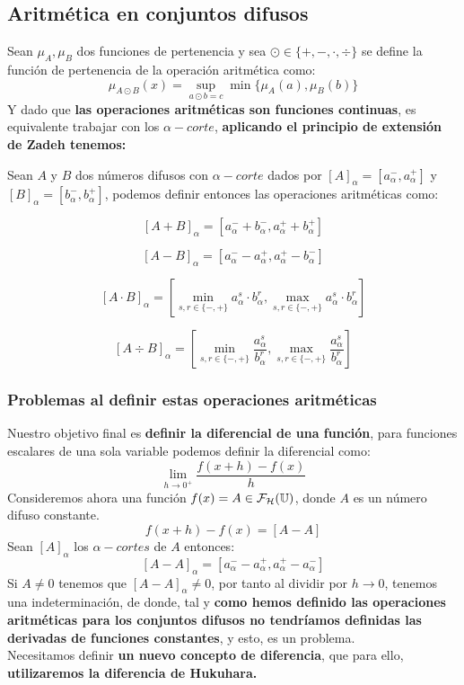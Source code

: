 \subsection{Aritmética en conjuntos difusos}
Sean $\mu_A, \mu_B$ dos funciones de pertenencia y sea $\odot \in \{+, -, \cdot, \div\}$ se define la función de pertenencia de la operación aritmética como:
$$
\mu_{A \odot B}(x) = \sup_{a \odot b = c} \min\{\mu_A(a), \mu_B(b)\}
$$
Y dado que \textbf{las operaciones aritméticas son funciones continuas}, es equivalente trabajar con los $\alpha-corte$, \textbf{aplicando el principio de extensión de Zadeh tenemos:}

Sean $A$ y $B$ dos números difusos con $\alpha-corte$ dados por $[A]_\alpha=[a_\alpha^-, a_\alpha^+]$ y $[B]_\alpha=[b_\alpha^-, b_\alpha^+]$, podemos definir entonces las operaciones aritméticas como:

$$
[A+B]_\alpha = [a_\alpha^- + b_\alpha^-, a_\alpha^+ + b_\alpha^+]
$$

$$
[A-B]_\alpha = [a_\alpha^- - a_\alpha^+, a_\alpha^+ - b_\alpha^-]
$$

$$
[A \cdot B]_\alpha = \left[ \min_{s, r \in \{-, +\}} a_\alpha^s \cdot b_\alpha^r, \max_{s, r \in \{-, +\}} a_\alpha^s \cdot b_\alpha^r\right]
$$

$$
[A \div B]_\alpha = \left[ \min_{s, r \in \{-, +\}} \frac{a_\alpha^s}{b_\alpha^r}, \max_{s, r \in \{-, +\}} \frac{a_\alpha^s}{b_\alpha^r}\right]
$$

\subsubsection{Problemas al definir estas operaciones aritméticas}
Nuestro objetivo final es \textbf{definir la diferencial de una función}, para funciones escalares de una sola variable podemos definir la diferencial como:
$$
\lim\limits_{h\rightarrow 0^+} \frac{f(x+h) - f(x)}{h}
$$
Consideremos ahora una función $f(x)=A\in \mathcal{F}_\mathcal{H}(\mathbb U)$, donde $A$ es un número difuso constante. \\
$$f(x+h) - f(x)=[A-A]$$
Sean $[A]_\alpha$ los $\alpha-cortes$ de $A$ entonces:
$$
[A-A]_\alpha = [a_\alpha^- - a_\alpha^+, a_\alpha^+ - a_\alpha^-]
$$
Si $A\neq 0$ tenemos que $[A-A]_\alpha \neq 0$, por tanto al dividir por $h \longrightarrow 0$, tenemos una indeterminación, de donde, tal y \textbf{como hemos definido las operaciones aritméticas para los conjuntos difusos no tendríamos definidas las derivadas de funciones constantes}, y esto, es un problema. \\
Necesitamos definir \textbf{un nuevo concepto de diferencia}, que para ello, \textbf{utilizaremos la diferencia de Hukuhara.}

